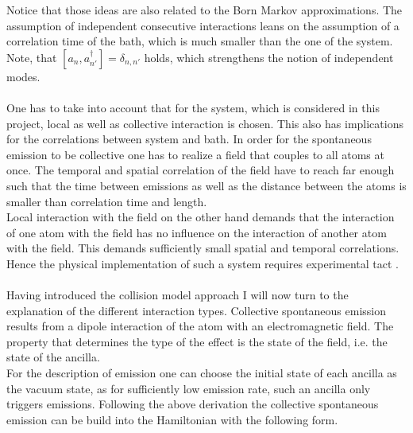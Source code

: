 Notice that those ideas are also related to the Born Markov approximations. The assumption of independent consecutive interactions leans on the assumption of a correlation time of the bath, which is much smaller than the one of the system. Note, that $[a_n,a^\dagger_{n'}]=\delta_{n,n'}$ holds, which strengthens the notion of independent modes.\\\\%
One has to take into account that for the system, which is considered in this project, local as well as collective interaction is chosen. This also has implications for the correlations between system and bath.
In order for the spontaneous emission to be collective one has to realize a field that couples to all atoms at once. The temporal and spatial correlation of the field have to reach far enough such that the time between emissions as well as the distance between the atoms is smaller than correlation time and length. \\Local interaction with the field on the other hand demands that the interaction of one atom with the field has no influence on the interaction of another atom with the field. This demands sufficiently small spatial and temporal correlations. Hence the physical implementation of such a system requires experimental tact \cite{diehl_quantum_2008,shaw_multi-ensemble_2024}.\\\\%
Having introduced the collision model approach I will now turn to the explanation of the different interaction types. Collective spontaneous emission results from a dipole interaction of the atom with an electromagnetic field. The property that determines the type of the effect is the state of the field, i.e. the state of the ancilla.\\
For the description of emission one can choose the initial state of each ancilla as the vacuum state, as for sufficiently low emission rate, such an ancilla only triggers emissions. Following the above derivation the collective spontaneous emission can be build into the Hamiltonian with the following form.
